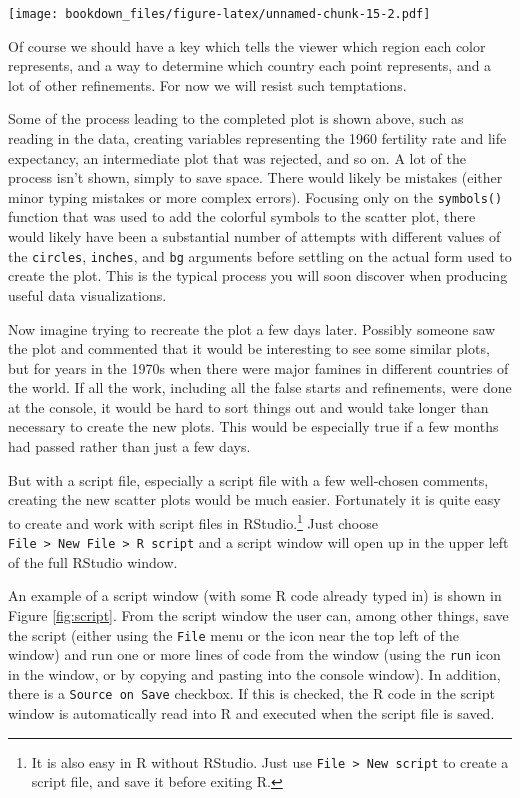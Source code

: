 \documentclass[]{krantz}
\begin{document}
\texttt{[image: bookdown\_files/figure-latex/unnamed-chunk-15-2.pdf]}

Of course we should have a key which tells the viewer which region each
color represents, and a way to determine which country each point
represents, and a lot of other refinements. For now we will resist such
temptations.

Some of the process leading to the completed plot is shown above, such
as reading in the data, creating variables representing the 1960
fertility rate and life expectancy, an intermediate plot that was
rejected, and so on. A lot of the process isn't shown, simply to save
space. There would likely be mistakes (either minor typing mistakes or
more complex errors). Focusing only on the \texttt{symbols()} function
that was used to add the colorful symbols to the scatter plot, there
would likely have been a substantial number of attempts with different
values of the \texttt{circles}, \texttt{inches}, and \texttt{bg}
arguments before settling on the actual form used to create the plot.
This is the typical process you will soon discover when producing useful
data visualizations.

Now imagine trying to recreate the plot a few days later. Possibly
someone saw the plot and commented that it would be interesting to see
some similar plots, but for years in the 1970s when there were major
famines in different countries of the world. If all the work, including
all the false starts and refinements, were done at the console, it would
be hard to sort things out and would take longer than necessary to
create the new plots. This would be especially true if a few months had
passed rather than just a few days.

But with a script file, especially a script file with a few well-chosen
comments, creating the new scatter plots would be much easier.
Fortunately it is quite easy to create and work with script files in
RStudio.\footnote{It is also easy in R without RStudio. Just use
  \texttt{File\ \textgreater{}\ New\ script} to create a script file,
  and save it before exiting R.} Just choose
\texttt{File\ \textgreater{}\ New\ File\ \textgreater{}\ R\ script} and
a script window will open up in the upper left of the full RStudio
window.

An example of a script window (with some R code already typed in) is
shown in Figure \ref{fig:script}. From the script window the user can,
among other things, save the script (either using the \texttt{File} menu
or the icon near the top left of the window) and run one or more lines
of code from the window (using the \texttt{run} icon in the window, or
by copying and pasting into the console window). In addition, there is a
\texttt{Source\ on\ Save} checkbox. If this is checked, the R code in
the script window is automatically read into R and executed when the
script file is saved.
\end{document}
